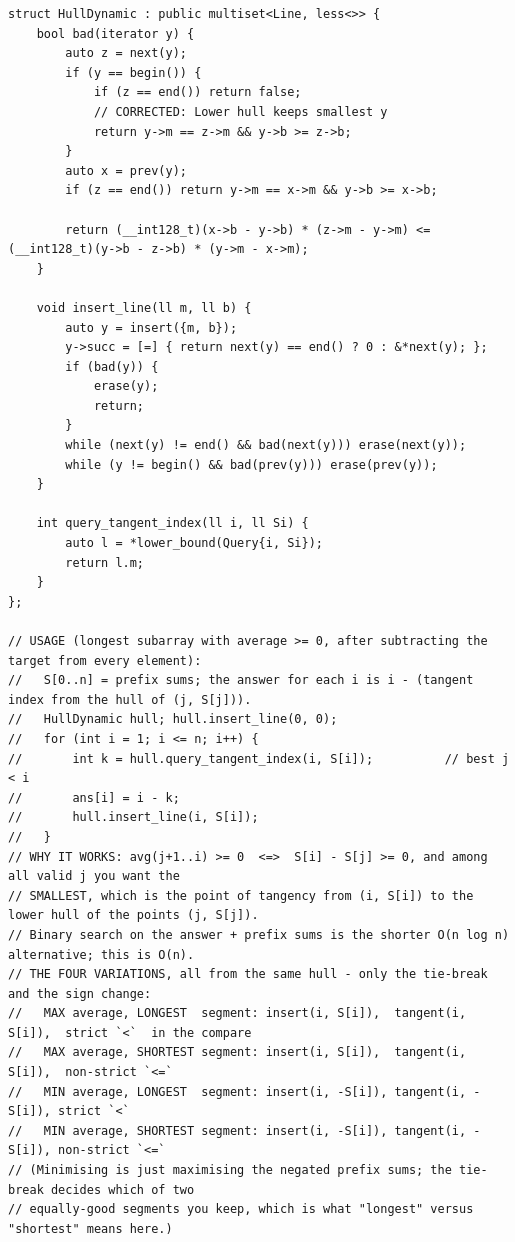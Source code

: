 \documentclass[9pt,a4paper,twocolumn]{extarticle}
\begin{document}
\begin{lstlisting}
struct HullDynamic : public multiset<Line, less<>> {
    bool bad(iterator y) {
        auto z = next(y);
        if (y == begin()) {
            if (z == end()) return false;
            // CORRECTED: Lower hull keeps smallest y
            return y->m == z->m && y->b >= z->b;
        }
        auto x = prev(y);
        if (z == end()) return y->m == x->m && y->b >= x->b;

        return (__int128_t)(x->b - y->b) * (z->m - y->m) <= (__int128_t)(y->b - z->b) * (y->m - x->m);
    }

    void insert_line(ll m, ll b) {
        auto y = insert({m, b});
        y->succ = [=] { return next(y) == end() ? 0 : &*next(y); };
        if (bad(y)) {
            erase(y);
            return;
        }
        while (next(y) != end() && bad(next(y))) erase(next(y));
        while (y != begin() && bad(prev(y))) erase(prev(y));
    }

    int query_tangent_index(ll i, ll Si) {
        auto l = *lower_bound(Query{i, Si});
        return l.m;
    }
};

// USAGE (longest subarray with average >= 0, after subtracting the target from every element):
//   S[0..n] = prefix sums; the answer for each i is i - (tangent index from the hull of (j, S[j])).
//   HullDynamic hull; hull.insert_line(0, 0);
//   for (int i = 1; i <= n; i++) {
//       int k = hull.query_tangent_index(i, S[i]);          // best j < i
//       ans[i] = i - k;
//       hull.insert_line(i, S[i]);
//   }
// WHY IT WORKS: avg(j+1..i) >= 0  <=>  S[i] - S[j] >= 0, and among all valid j you want the
// SMALLEST, which is the point of tangency from (i, S[i]) to the lower hull of the points (j, S[j]).
// Binary search on the answer + prefix sums is the shorter O(n log n) alternative; this is O(n).
// THE FOUR VARIATIONS, all from the same hull - only the tie-break and the sign change:
//   MAX average, LONGEST  segment: insert(i, S[i]),  tangent(i, S[i]),  strict `<`  in the compare
//   MAX average, SHORTEST segment: insert(i, S[i]),  tangent(i, S[i]),  non-strict `<=`
//   MIN average, LONGEST  segment: insert(i, -S[i]), tangent(i, -S[i]), strict `<`
//   MIN average, SHORTEST segment: insert(i, -S[i]), tangent(i, -S[i]), non-strict `<=`
// (Minimising is just maximising the negated prefix sums; the tie-break decides which of two
// equally-good segments you keep, which is what "longest" versus "shortest" means here.)
\end{lstlisting}

\filbreak
\end{document}
